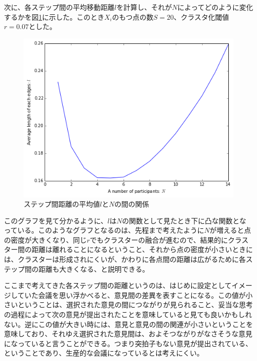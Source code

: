 次に、各ステップ間の平均移動距離$l$を計算し、それが$N$によってどのように変化するかを図\ref{fig:f24}に示した。このとき$X_{i}$のもつ点の数$S=20$、クラスタ化閾値$r=0.07$とした。
\begin{figure}[H]
    \begin{center}
        \includegraphics[width=12.5cm]{../img/N_l.png}
        \caption{ステップ間距離の平均値$l$と$N$の間の関係}
        \label{fig:f24}
    \end{center}
\end{figure}
このグラフを見て分かるように、$l$は$N$の関数として見たとき下に凸な関数となっている。このようなグラフとなるのは、先程まで考えたように$N$が増えると点の密度が大きくなり、同じ$r$でもクラスターの融合が進むので、結果的にクラスター間の距離は離れることになるということ、それから点の密度が小さいときには、クラスターは形成されにくいが、かわりに各点間の距離は広がるために各ステップ間の距離も大きくなる、と説明できる。

ここまで考えてきた各ステップ間の距離というのは、はじめに設定としてイメージしていた会議を思い浮かべると、意見間の差異を表すことになる。この値が小さいということは、選択された意見の間につながりが見られること、妥当な思考の過程によって次の意見が提出されたことを意味していると見ても良いかもしれない。逆にこの値が大きい時には、意見と意見の間の関連が小さいということを意味しており、それゆえ選択された意見間は、およそつながりがなさそうな意見になっていると言うことができる。つまり突拍子もない意見が提出されている、ということであり、生産的な会議になっているとは考えにくい。
